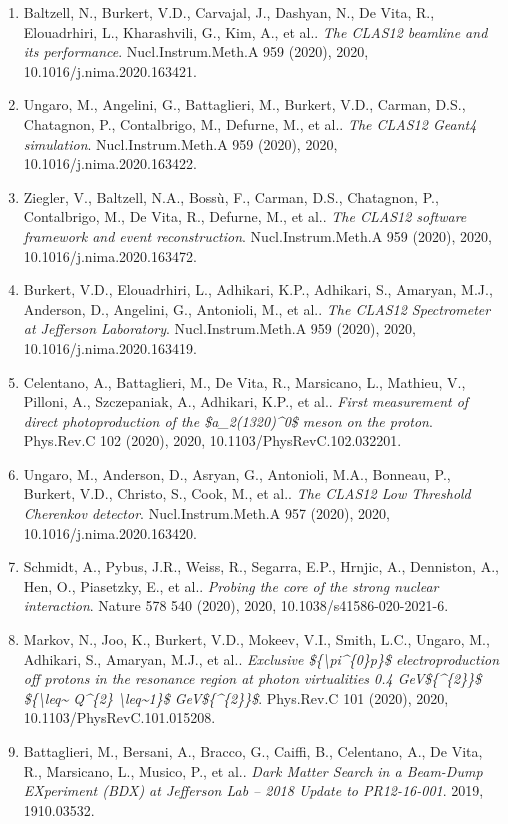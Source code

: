 \begin{enumerate}
\item Baltzell, N., Burkert, V.D., Carvajal, J., Dashyan, N., De Vita, R., Elouadrhiri, L., Kharashvili, G., Kim, A., et al.. \textit{The CLAS12 beamline and its performance}. Nucl.Instrum.Meth.A 959 (2020), 2020, 10.1016/j.nima.2020.163421.
\item Ungaro, M., Angelini, G., Battaglieri, M., Burkert, V.D., Carman, D.S., Chatagnon, P., Contalbrigo, M., Defurne, M., et al.. \textit{The CLAS12 Geant4 simulation}. Nucl.Instrum.Meth.A 959 (2020), 2020, 10.1016/j.nima.2020.163422.
\item Ziegler, V., Baltzell, N.A., Bossù, F., Carman, D.S., Chatagnon, P., Contalbrigo, M., De Vita, R., Defurne, M., et al.. \textit{The CLAS12 software framework and event reconstruction}. Nucl.Instrum.Meth.A 959 (2020), 2020, 10.1016/j.nima.2020.163472.
\item Burkert, V.D., Elouadrhiri, L., Adhikari, K.P., Adhikari, S., Amaryan, M.J., Anderson, D., Angelini, G., Antonioli, M., et al.. \textit{The CLAS12 Spectrometer at Jefferson Laboratory}. Nucl.Instrum.Meth.A 959 (2020), 2020, 10.1016/j.nima.2020.163419.
\item Celentano, A., Battaglieri, M., De Vita, R., Marsicano, L., Mathieu, V., Pilloni, A., Szczepaniak, A., Adhikari, K.P., et al.. \textit{First measurement of direct photoproduction of the \$a\_2(1320)\textasciicircum{}0\$ meson on the proton}. Phys.Rev.C 102 (2020), 2020, 10.1103/PhysRevC.102.032201.
\item Ungaro, M., Anderson, D., Asryan, G., Antonioli, M.A., Bonneau, P., Burkert, V.D., Christo, S., Cook, M., et al.. \textit{The CLAS12 Low Threshold Cherenkov detector}. Nucl.Instrum.Meth.A 957 (2020), 2020, 10.1016/j.nima.2020.163420.
\item Schmidt, A., Pybus, J.R., Weiss, R., Segarra, E.P., Hrnjic, A., Denniston, A., Hen, O., Piasetzky, E., et al.. \textit{Probing the core of the strong nuclear interaction}. Nature 578 540 (2020), 2020, 10.1038/s41586-020-2021-6.
\item Markov, N., Joo, K., Burkert, V.D., Mokeev, V.I., Smith, L.C., Ungaro, M., Adhikari, S., Amaryan, M.J., et al.. \textit{Exclusive \$\{\textbackslash{}pi\textasciicircum{}\{0\}p\}\$ electroproduction off protons in the resonance region at photon virtualities 0.4 GeV\$\{\textasciicircum{}\{2\}\}\$ \$\{\textbackslash{}leq\textasciitilde{} Q\textasciicircum{}\{2\} \textbackslash{}leq\textasciitilde{}1\}\$ GeV\$\{\textasciicircum{}\{2\}\}\$}. Phys.Rev.C 101 (2020), 2020, 10.1103/PhysRevC.101.015208.
\item Battaglieri, M., Bersani, A., Bracco, G., Caiffi, B., Celentano, A., De Vita, R., Marsicano, L., Musico, P., et al.. \textit{Dark Matter Search in a Beam-Dump EXperiment (BDX) at Jefferson Lab -- 2018 Update to PR12-16-001}. 2019, 1910.03532.

\end{enumerate}
